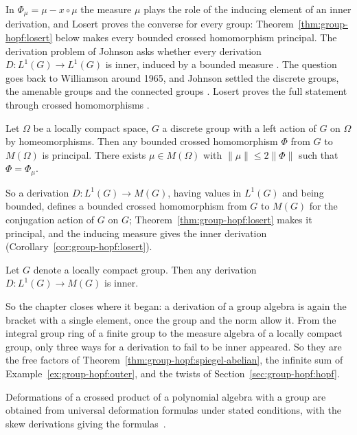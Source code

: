 In $\Phi_\mu=\mu-x\circ\mu$ the measure $\mu$ plays the role of the inducing
element of an inner derivation, and Losert proves the converse for every group:
Theorem~\ref{thm:group-hopf:losert} below makes every bounded crossed homomorphism
principal. The derivation problem of Johnson asks whether every derivation
$D\colon L^1(G)\to L^1(G)$ is inner, induced by a bounded measure
\cite[p.~221]{Losert2008}. The question goes back to Williamson around 1965, and
Johnson settled the discrete groups, the amenable groups and the connected groups
\cite[p.~221]{Losert2008}. Losert proves the full statement through crossed
homomorphisms \cite[p.~222]{Losert2008}.

\begin{theorem}\label{thm:group-hopf:losert}
Let $\Omega$ be a locally compact space, $G$ a discrete group with a left action of
$G$ on $\Omega$ by homeomorphisms. Then any bounded crossed homomorphism $\Phi$
from $G$ to $M(\Omega)$ is principal. There exists $\mu\in M(\Omega)$ with
$\|\mu\|\le 2\|\Phi\|$ such that $\Phi=\Phi_\mu$.
\end{theorem}

So a derivation $D\colon L^1(G)\to M(G)$, having values in $L^1(G)$ and being
bounded, defines a bounded crossed homomorphism from $G$ to $M(G)$ for the
conjugation action of $G$ on $G$; Theorem~\ref{thm:group-hopf:losert} makes it
principal, and the inducing measure gives the inner derivation
\cite[p.~222]{Losert2008} (Corollary~\ref{cor:group-hopf:losert}).

\begin{corollary}\label{cor:group-hopf:losert}
Let $G$ denote a locally compact group. Then any derivation
$D\colon L^1(G)\to M(G)$ is inner.
\end{corollary}

So the chapter closes where it began: a derivation of a group algebra is again the
bracket with a single element, once the group and the norm allow it. From the
integral group ring of a finite group to the measure algebra of a locally compact
group, only three ways for a derivation to fail to be inner appeared. %
So they are the free factors of Theorem~\ref{thm:group-hopf:spiegel-abelian}, the
infinite sum of Example~\ref{ex:group-hopf:outer}, and the twists of
Section~\ref{sec:group-hopf:hopf}.

Deformations of a crossed product of a polynomial algebra with a group are obtained from universal deformation formulas under stated conditions, with the skew derivations giving the formulas~\cite{WlSkewDerivationsAndDeformations2019}.
